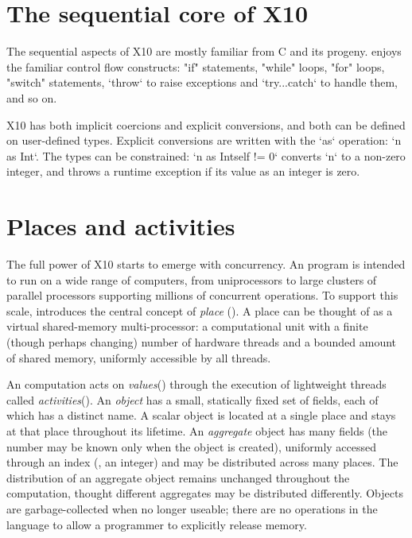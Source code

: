 
\section{The sequential core of X10}

The sequential aspects of X10 are mostly familiar from C and its progeny.
\Xten{} enjoys the familiar control flow constructs: \xcd"if" statements,
\xcd"while" loops, \xcd"for" loops, \xcd"switch" statements, \xcd`throw` to
raise exceptions and \xcd`try...catch` to handle them, and so on.

X10 has both implicit coercions and explicit conversions, and both can be
defined on user-defined types.  Explicit conversions are written with the
\xcd`as` operation: \xcd`n as Int`.  The types can be constrained: 
\xcd`n as Int{self != 0}` converts \xcd`n` to a non-zero integer, and throws a
runtime exception if its value as an integer is zero.

\section{Places and activities}

The full power of X10 starts to emerge with concurrency.
An \Xten{} program is intended to run on a wide range of computers,
from uniprocessors to large clusters of parallel processors supporting
millions of concurrent operations. To support this scale, \Xten{}
introduces the central concept of \emph{place} ().
A place can be thought of as a virtual shared-memory multi-processor:
a computational unit with a finite (though perhaps changing) number of
hardware threads and a bounded amount of shared memory, uniformly
accessible by all threads.



An \Xten{} computation acts on \emph{values}() through
the execution of lightweight threads called
\emph{activities}(). 
An {\em object}
 has a small, statically fixed set of fields, each of
which has a distinct name. A scalar object is located at a single place and
stays at that place throughout its lifetime. An \emph{aggregate} object has
many fields (the number may be known only when the object is created),
uniformly accessed through an index (\eg, an integer) and may be distributed
across many places. The distribution of an aggregate object remains unchanged
throughout the computation, thought different aggregates may be distributed
differently. Objects are garbage-collected when no longer useable; there are
no operations in the language to allow a programmer to explicitly release
memory.

